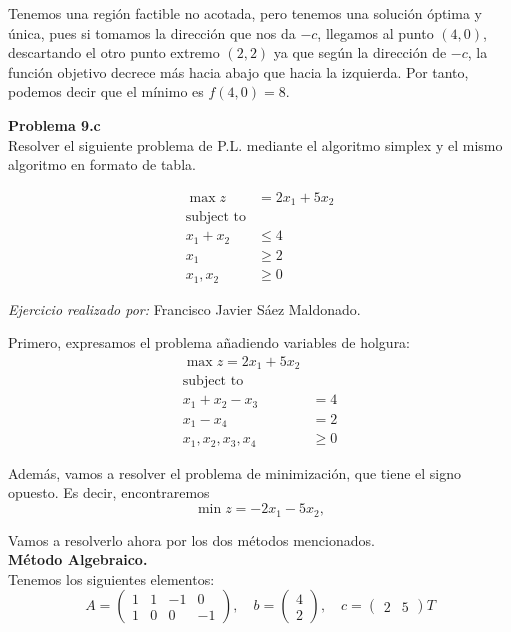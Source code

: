 \documentclass[11pt,table]{article}
\newenvironment{problem}[2][Problema]
    { \begin{mdframed}[backgroundcolor=gray!20] \textbf{#1 #2} \\}
    {  \end{mdframed}}
\begin{document}
Tenemos una región factible no acotada, pero tenemos una solución óptima y única, pues si tomamos la dirección que nos da $-c$, llegamos al punto $(4,0)$, descartando el otro punto extremo $(2,2)$ ya que según la dirección de $-c$, la función objetivo decrece más hacia abajo que hacia la izquierda. Por tanto, podemos decir que el mínimo es $f(4,0) = 8$.\\

    
    \begin{problem}{9.c}

    Resolver el siguiente problema de P.L. mediante el algoritmo simplex y el mismo algoritmo en formato de tabla.

      \begin{align*}
        \max z & = 2x_{1} + 5x_{2} \\
        \text{subject to} \\
        x_{1} + x_{2} & \leq 4\\
        x_{1} & \geq 2\\
        x_{1},x_{2} & \geq 0
    \end{align*}

    
\end{problem}

\emph{Ejercicio realizado por:} Francisco Javier Sáez Maldonado.

        
    Primero, expresamos el problema añadiendo variables de holgura:
    \begin{align*}
        \max z = 2x_{1} + 5x_{2} \\
        \text{subject to} \\
        x_{1} + x_{2} - x_{3} & = 4\\
        x_{1} - x_{4} & =  2\\
        x_{1},x_{2},x_{3},x_{4} & \geq 0
    \end{align*}

    Además, vamos a resolver el problema de minimización, que tiene el signo opuesto. Es decir, encontraremos
    \[
    \min z = -2x_1 - 5x_2,
    \]

    Vamos a resolverlo ahora por los dos métodos mencionados.\\

    \textbf{Método Algebraico.}\\

    Tenemos los siguientes elementos:
    \[
    A = \begin{pmatrix} 1 & 1 & -1 & 0 \\ 1 & 0 & 0 & -1\end{pmatrix}, \quad b = \begin{pmatrix} 4 \\ 2\end{pmatrix}, \quad c = \begin{pmatrix} 2 & 5\end{pmatrix}{T}   
    \]
\end{document}
